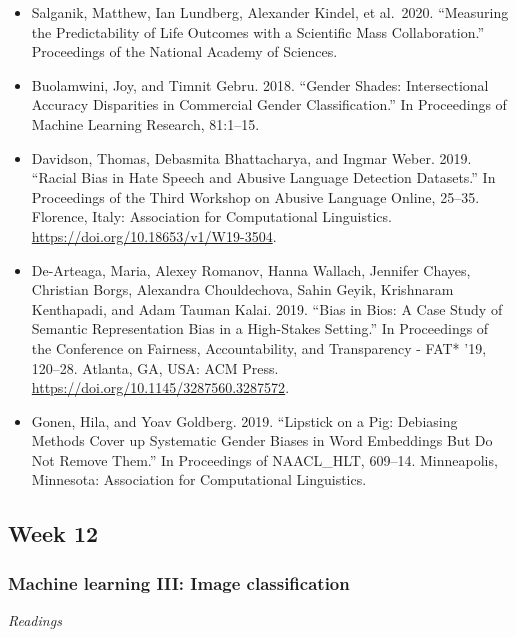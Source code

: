 \documentclass[
  10pt,
]{article}
\providecommand{\tightlist}{%
  \setlength{\itemsep}{0pt}\setlength{\parskip}{0pt}}
\begin{document}
\begin{itemize}
\tightlist
\item
  Salganik, Matthew, Ian Lundberg, Alexander Kindel, et al.~2020.
  ``Measuring the Predictability of Life Outcomes with a Scientiﬁc Mass
  Collaboration.'' Proceedings of the National Academy of Sciences.
\item
  Buolamwini, Joy, and Timnit Gebru. 2018. ``Gender Shades:
  Intersectional Accuracy Disparities in Commercial Gender
  Classiﬁcation.'' In Proceedings of Machine Learning Research,
  81:1--15.
\item
  Davidson, Thomas, Debasmita Bhattacharya, and Ingmar Weber. 2019.
  ``Racial Bias in Hate Speech and Abusive Language Detection
  Datasets.'' In Proceedings of the Third Workshop on Abusive Language
  Online, 25--35. Florence, Italy: Association for Computational
  Linguistics. \url{https://doi.org/10.18653/v1/W19-3504}.
\item
  De-Arteaga, Maria, Alexey Romanov, Hanna Wallach, Jennifer Chayes,
  Christian Borgs, Alexandra Chouldechova, Sahin Geyik, Krishnaram
  Kenthapadi, and Adam Tauman Kalai. 2019. ``Bias in Bios: A Case Study
  of Semantic Representation Bias in a High-Stakes Setting.'' In
  Proceedings of the Conference on Fairness, Accountability, and
  Transparency - FAT* '19, 120--28. Atlanta, GA, USA: ACM Press.
  \url{https://doi.org/10.1145/3287560.3287572}.
\item
  Gonen, Hila, and Yoav Goldberg. 2019. ``Lipstick on a Pig: Debiasing
  Methods Cover up Systematic Gender Biases in Word Embeddings But Do
  Not Remove Them.'' In Proceedings of NAACL\_HLT, 609--14. Minneapolis,
  Minnesota: Association for Computational Linguistics.
\end{itemize}

\hypertarget{week-12}{%
\subsection{Week 12}\label{week-12}}

\hypertarget{machine-learning-iii-image-classification}{%
\subsubsection{Machine learning III: Image
classification}\label{machine-learning-iii-image-classification}}

\emph{Readings}
\end{document}
